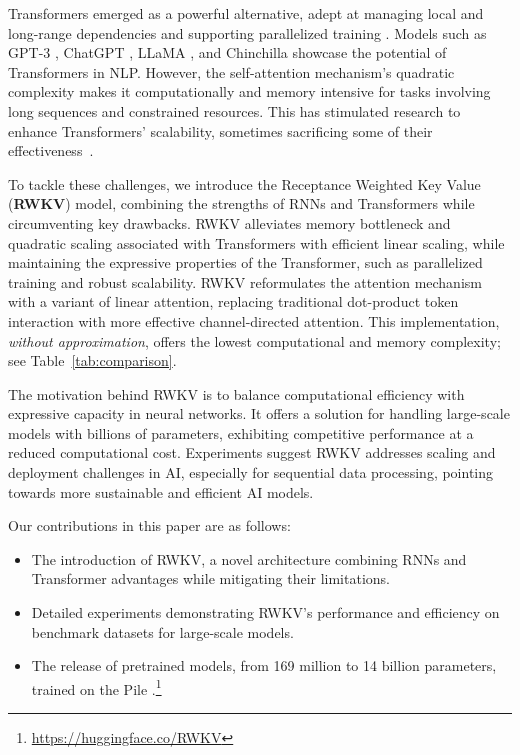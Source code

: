 Transformers emerged as a powerful alternative, adept at managing local and long-range dependencies and supporting parallelized training \cite{tay2022efficient}. Models such as GPT-3 \cite{brown2020language}, ChatGPT \cite{openai2022chatgpt,kocon2023chatgpt}, LLaMA \cite{touvron2023llama}, and Chinchilla \cite{hoffmann2022training} showcase the potential of Transformers in NLP. However, the self-attention mechanism's  quadratic complexity makes it computationally and memory intensive for tasks involving long sequences and constrained resources. This has stimulated research to enhance Transformers' scalability, sometimes sacrificing some of their effectiveness~\cite{wang2020linformer,zaheer2020bigbird,dao2022flashattention}. 

To tackle these challenges, we introduce the Receptance Weighted Key Value (\textbf{RWKV}) model, combining the strengths of RNNs and Transformers while circumventing key drawbacks. RWKV alleviates  memory bottleneck and quadratic scaling associated with Transformers  \cite{katharopoulos2020transformers} with efficient linear scaling, while maintaining the expressive properties of the Transformer, such as  parallelized training and robust scalability. RWKV reformulates the attention mechanism with a variant of linear attention, replacing traditional dot-product token interaction with more effective channel-directed attention. This implementation, \emph{without approximation}, offers the lowest computational and memory complexity; see Table~\ref{tab:comparison}.

The motivation behind RWKV is to balance computational efficiency with expressive capacity in neural networks. It offers a solution for handling large-scale models with billions of parameters, exhibiting competitive performance at a reduced computational cost. Experiments suggest RWKV addresses  scaling and deployment challenges in AI, especially for sequential data processing, pointing towards more sustainable and efficient AI models.

Our contributions in this paper are as follows:

\begin{itemize}
 \item The introduction of RWKV, a novel architecture combining RNNs and Transformer advantages while mitigating their limitations.

 \item Detailed experiments demonstrating RWKV's performance and efficiency on benchmark datasets for large-scale models. 
 \item The release of pretrained models, from 169 million to 14 billion parameters, trained on the Pile \cite{gao2020pile,biderman2022datasheet}.\footnote{\href{https://huggingface.co/RWKV}{https://huggingface.co/RWKV}}
\end{itemize}

